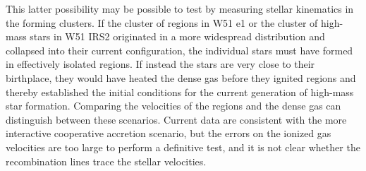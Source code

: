 \documentclass[twocolumn]{aastex61}
\begin{document}
This latter possibility may be possible to test by
measuring stellar kinematics in the forming clusters.  If the cluster of \hchii
regions in W51 e1 or the cluster of high-mass stars in W51 IRS2 originated in a
more widespread distribution and collapsed into their current configuration,
the individual stars must have formed in  effectively isolated regions.  If
instead the stars are very close to their birthplace, they would have heated the
dense gas before they ignited \hii regions and thereby established the initial
conditions for the current generation of high-mass star formation.  Comparing
the velocities of the \hii regions and the dense gas can distinguish
between these scenarios.  Current data \citep[i.e., H77$\alpha$ measurements
in][]{Ginsburg2016a} are consistent
with the more interactive cooperative accretion scenario, but the errors on the
ionized gas velocities are too large to perform a definitive test, and it is not
clear whether the recombination lines trace the stellar velocities.





\end{document}
